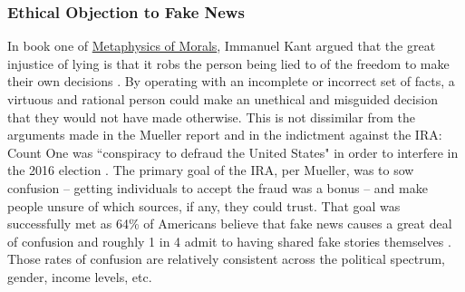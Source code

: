 \documentclass[preprint,review,12pt]{elsarticle}
\begin{document}
\subsubsection{Ethical Objection to Fake News}
In book one of \underline{Metaphysics of Morals}, Immanuel Kant argued that the great injustice of lying is that it robs the person being lied to of the freedom to make their own decisions \cite{kant1996metaphysics}. By operating with an incomplete or incorrect set of facts, a virtuous and rational person could make an unethical and misguided decision that they would not have made otherwise. This is not dissimilar from the arguments made in the Mueller report and in the indictment against the IRA: Count One was ``conspiracy to defraud the United States" in order to interfere in the 2016 election  \cite{mueller2019mueller,mueller2020internet}. The primary goal of the IRA, per Mueller, was to sow confusion -- getting individuals to accept the fraud was a bonus -- and make people unsure of which sources, if any, they could trust. That goal was successfully met as 64\% of Americans believe that fake news causes a great deal of confusion and roughly 1 in 4 admit to having shared fake stories themselves \cite{barthel2016americans}. Those rates of confusion are relatively consistent across the political spectrum, gender, income levels, etc. 
\end{document}
